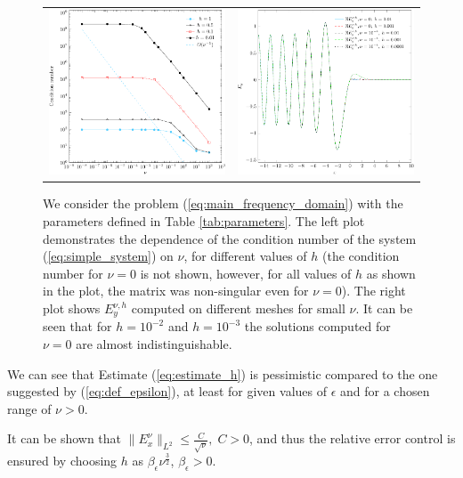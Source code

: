 \begin{figure}%
\begin{tabular}{cc}
\includegraphics[height=0.32\textwidth]{pics_frequency_domain/fig_cond_num.pdf}&
 \includegraphics[height=0.32\textwidth]{pics_frequency_domain/ey_resonance.pdf}
 \end{tabular}
 \caption{
 We consider the problem (\ref{eq:main_frequency_domain}) with the parameters 
defined in Table \ref{tab:parameters}. The left plot demonstrates the dependence of the condition number of the system (\ref{eq:simple_system}) on $\nu$, for different values of $h$ (the condition 
 number for $\nu=0$ is not shown, however, for all values of $h$ as shown in the plot, the matrix was non-singular even for $\nu=0$). 
 The right plot shows $E_{y}^{\nu,h}$ computed on different meshes for small $\nu$. It can be seen that for $h=10^{-2}$ and $h=10^{-3}$ the solutions 
 computed for $\nu=0$ are almost indistinguishable.}
 \label{fig:small_nu}
\end{figure}
We can see that Estimate (\ref{eq:estimate_h}) is pessimistic compared to the one suggested by (\ref{eq:def_epsilon}), 
at least for given values of $\epsilon$ and for a chosen range of $\nu>0$.
\begin{remark}
It can be shown that $\|E^{\nu}_{x}\|_{L^2}\leq \frac{C}{\sqrt{\nu}},\; C>0$, 
and thus the relative error control
\bealn
 \leq \epsilon
\eealn
 is ensured by choosing $h$ as $\beta_{\epsilon}\nu^{\frac{3}{2}}$, $\beta_{\epsilon}>0$.
\end{remark}



